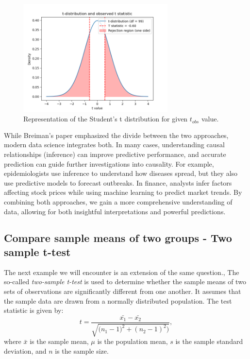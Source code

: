 \documentclass{book}
\begin{document}
\begin{figure}[ht]
    \centering
    \includegraphics[width=0.7\textwidth]{figures/chapter4/t_1_sample_distribution.png}
    \caption{Representation of the Student's t distribution for given $t_{obs}$ value.}
    \label{fig:t_1_sample_dist}
\end{figure}

While Breiman’s paper emphasized the divide between the two approaches, modern data science integrates both. In many cases, understanding causal relationships (inference) can improve predictive performance, and accurate prediction can guide further investigations into causality. For example, epidemiologists use inference to understand how diseases spread, but they also use predictive models to forecast outbreaks. In finance, analysts infer factors affecting stock prices while using machine learning to predict market trends. By combining both approaches, we gain a more comprehensive understanding of data, allowing for both insightful interpretations and powerful predictions.

\newpage
\subsection{Compare sample means of two groups - Two sample t-test}

The next example we will encounter is an extension of the same question., The so-called \textit{two-sample t-test} is used to determine whether the sample means of two sets of observations are significantly different from one another. It assumes that the sample data are drawn from a normally distributed population. The test statistic is given by:
\[
    t = \frac{\bar{x_{1}} - \bar{x_{2}}}{\sqrt{\big(n_{1} - 1)^{2} + (n_{2} - 1)^{2}\big)}},
\]
where $\bar{x}$ is the sample mean, $\mu$ is the population mean, $s$ is the sample standard deviation, and $n$ is the sample size.
\end{document}
